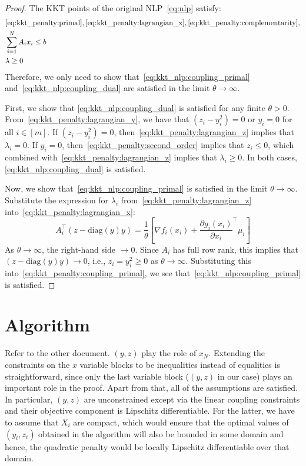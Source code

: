 \documentclass[11pt]{article}
\begin{document}
\begin{proof}
    The KKT points of the original NLP~\eqref{eq:nlp} satisfy:
    \begin{subequations}\label{eq:kkt_nlp}
        \begin{align}
        & \eqref{eq:kkt_penalty:primal}, \eqref{eq:kkt_penalty:lagrangian_x}, \eqref{eq:kkt_penalty:complementarity}, \notag\\
        & \sum_{i = 1}^N A_i x_i \leq b \label{eq:kkt_nlp:coupling_primal}\\
        & \lambda \geq 0 \label{eq:kkt_nlp:coupling_dual}
        \end{align}
    \end{subequations}
Therefore, we only need to show that~\eqref{eq:kkt_nlp:coupling_primal} and~\eqref{eq:kkt_nlp:coupling_dual} are satisfied in the limit $\theta \to \infty$.

First, we show that \eqref{eq:kkt_nlp:coupling_dual} is satisfied for any finite $\theta > 0$.
From~\eqref{eq:kkt_penalty:lagrangian_y}, we have that $(z_i - y_i^2)  = 0$ or $y_i = 0$ for all $i \in [m]$.
If $(z_i - y_i^2)  = 0$, then~\eqref{eq:kkt_penalty:lagrangian_z} implies that $\lambda_i = 0$.
If $y_i = 0$, then~\eqref{eq:kkt_penalty:second_order} implies that $z_i \leq 0$, which combined with~\eqref{eq:kkt_penalty:lagrangian_z} implies that $\lambda_i \geq 0$.
In both cases, \eqref{eq:kkt_nlp:coupling_dual} is satisfied.

Now, we show that~\eqref{eq:kkt_nlp:coupling_primal} is satisfied in the limit $\theta \to \infty$.
Substitute the expression for $\lambda_i$ from~\eqref{eq:kkt_penalty:lagrangian_z} into~\eqref{eq:kkt_penalty:lagrangian_x}:
\begin{equation*}
A_i^\top (z - \mathrm{diag}(y)y) = \frac{1}{\theta} \left[\nabla f_i(x_i) + \frac{\partial g_i(x_i)}{\partial x_i}^\top \mu_i\right]
\end{equation*}
As $\theta \to \infty$, the right-hand side $\to 0$. Since $A_i$ has full row rank, this implies that $(z - \mathrm{diag}(y)y) \to 0$, i.e., $z_i = y_i^2 \geq 0$ as $\theta \to \infty$.
Substituting this into~\eqref{eq:kkt_penalty:coupling_primal}, we see that~\eqref{eq:kkt_nlp:coupling_primal} is satisfied.
\end{proof}


\section{Algorithm}
Refer to the other document.
$(y, z)$ play the role of $x_N$.
Extending the constraints on the $x$ variable blocks to be inequalities instead of equalities is straightforward, since only the last variable block ($(y, z)$ in our case) plays an important role in the proof.
Apart from that, all of the assumptions are satisfied.
In particular, $(y, z)$ are unconstrained except via the linear coupling constraints and their objective component is Lipschitz differentiable.
For the latter, we have to assume that $X_i$ are compact, which would ensure that the optimal values of $(y_i, z_i)$ obtained in the algorithm will also be bounded in some domain and hence, the quadratic penalty would be locally Lipschitz differentiable over that domain.
\end{document}
